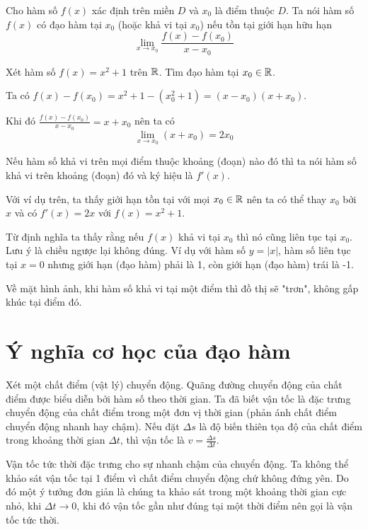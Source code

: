 \begin{definition}
    Cho hàm số $f(x)$ xác định trên miền $D$ và $x_0$ là điểm thuộc $D$.
    Ta nói hàm số $f(x)$ có đạo hàm tại $x_0$ (hoặc khả vi tại $x_0$) nếu
    tồn tại giới hạn hữu hạn
    \[\lim_{x \to x_0}\frac{f(x) - f(x_0)}{x - x_0}\]
\end{definition}

\begin{example}
    Xét hàm số $f(x) = x^2 + 1$ trên $\mathbb{R}$. Tìm đạo hàm tại $x_0 \in \mathbb{R}$.

    Ta có $f(x)-f(x_0) = x^2 + 1 - (x_0^2 + 1) = (x - x_0) (x + x_0)$.

    Khi đó $\frac{f(x)-f(x_0)}{x-x_0} = x + x_0$ nên ta có
    \[ \lim_{x \to x_0} (x + x_0) = 2 x_0 \]
\end{example}

Nếu hàm số khả vi trên mọi điểm thuộc khoảng (đoạn) nào đó thì
ta nói hàm số khả vi trên khoảng (đoạn) đó và ký hiệu là $f'(x)$.

Với ví dụ trên, ta thấy giới hạn tồn tại với mọi $x_0 \in \mathbb{R}$ nên ta có thể
thay $x_0$ bởi $x$ và có $f'(x) = 2x$ với $f(x) = x^2 + 1$.

\begin{remark}
    Từ định nghĩa ta thấy rằng nếu $f(x)$ khả vi tại $x_0$ thì nó cũng liên tục tại $x_0$.
    Lưu ý là chiều ngược lại không đúng. Ví dụ với hàm số $y = \lvert x \rvert$, 
    hàm số liên tục tại $x=0$ nhưng giới hạn (đạo hàm) phải là 1, 
    còn giới hạn (đạo hàm) trái là -1.
\end{remark}

Về mặt hình ảnh, khi hàm số khả vi tại một điểm thì đồ thị sẽ "trơn",
không gấp khúc tại điểm đó.

\section{Ý nghĩa cơ học của đạo hàm}

Xét một chất điểm (vật lý) chuyển động. Quãng đường chuyển động của chất điểm được 
biểu diễn bởi hàm số theo thời gian. Ta đã biết vận tốc là đặc trưng chuyển động của 
chất điểm trong một đơn vị thời gian (phản ánh chất điểm chuyển động nhanh hay chậm).
Nếu đặt $\Delta s$ là độ biến thiên tọa độ của chất điểm trong khoảng thời gian $\Delta t$,
thì vận tốc là $v = \frac{\Delta s}{\Delta t}$.

Vận tốc tức thời đặc trưng cho sự nhanh chậm của chuyển động.
Ta không thể khảo sát vận tốc tại 1 điểm vì chất điểm chuyển động
chứ không đứng yên. Do đó một ý tưởng đơn giản là chúng ta khảo sát
trong một khoảng thời gian cực nhỏ, khi $\Delta t \to 0$, khi đó
vận tốc gần như đúng tại một thời điểm nên gọi là vận tốc tức thời.

